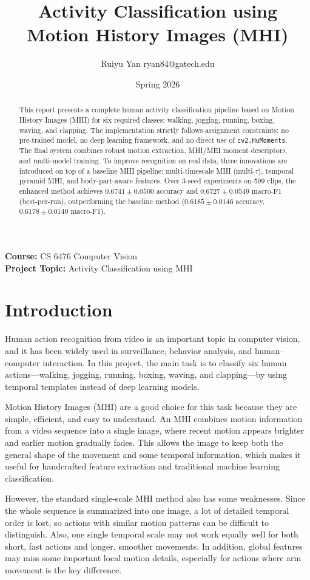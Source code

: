 \documentclass[11pt]{article}
\title{Activity Classification using Motion History Images (MHI)}
\author{Ruiyu Yan \; ryan84@gatech.edu}
\date{Spring 2026}
\begin{document}
\maketitle

\noindent\textbf{Course:} CS 6476 Computer Vision \\
\textbf{Project Topic:} Activity Classification using MHI

\begin{abstract}
This report presents a complete human activity classification pipeline based on Motion History Images (MHI) for six required classes: walking, jogging, running, boxing, waving, and clapping. The implementation strictly follows assignment constraints: no pre-trained model, no deep learning framework, and no direct use of \texttt{cv2.HuMoments}. The final system combines robust motion extraction, MHI/MEI moment descriptors, and multi-model training. To improve recognition on real data, three innovations are introduced on top of a baseline MHI pipeline: multi-timescale MHI (multi-$\tau$), temporal pyramid MHI, and body-part-aware features. Over 3-seed experiments on 599 clips, the enhanced method achieves $0.6741\pm0.0500$ accuracy and $0.6727\pm0.0549$ macro-F1 (best-per-run), outperforming the baseline method ($0.6185\pm0.0146$ accuracy, $0.6178\pm0.0140$ macro-F1).
\end{abstract}




\section{Introduction}
Human action recognition from video is an important topic in computer vision, and it has been widely used in surveillance, behavior analysis, and human--computer interaction. In this project, the main task is to classify six human actions---walking, jogging, running, boxing, waving, and clapping---by using temporal templates instead of deep learning models.

Motion History Images (MHI) are a good choice for this task because they are simple, efficient, and easy to understand. An MHI combines motion information from a video sequence into a single image, where recent motion appears brighter and earlier motion gradually fades. This allows the image to keep both the general shape of the movement and some temporal information, which makes it useful for handcrafted feature extraction and traditional machine learning classification.

However, the standard single-scale MHI method also has some weaknesses. Since the whole sequence is summarized into one image, a lot of detailed temporal order is lost, so actions with similar motion patterns can be difficult to distinguish. Also, one single temporal scale may not work equally well for both short, fast actions and longer, smoother movements. In addition, global features may miss some important local motion details, especially for actions where arm movement is the key difference.
\end{document}
